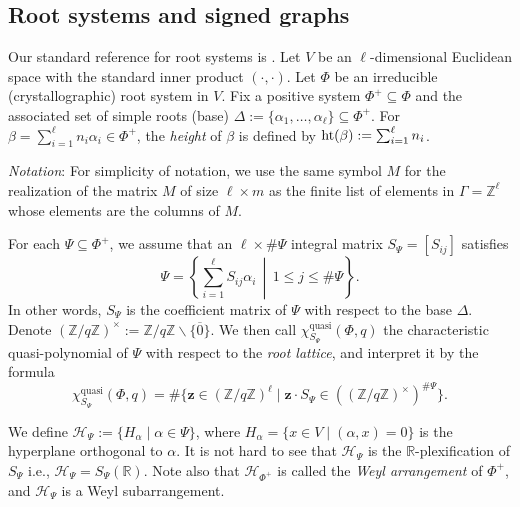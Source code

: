 \documentclass[12pt]{amsart}
\theoremstyle{plain}
\theoremstyle{definition}
\theoremstyle{remark}
\newcommand{\R}{\mathbb{R}}
\newcommand{\Z}{\mathbb{Z}}
\newcommand{\scH}{{\mathcal{H}}}
\newcommand{\quasi}{\operatorname{quasi}}
\begin{document}
\subsection{Root systems and signed graphs}
\label{subsec:Root-systems} 
Our standard reference for root systems is \cite{B68}.
Let $V$ be an $\ell$-dimensional Euclidean space with the standard inner product $(\cdot,\cdot)$. Let $\Phi$ be an irreducible (crystallographic) root system in $V$. 
Fix a positive system $\Phi^+ \subseteq \Phi$ and the associated set of simple roots (base) $\Delta := \{\alpha_1,\ldots,\alpha_\ell \} \subseteq\Phi^+$. 
For $\beta = \sum_{i=1}^\ell n_i\alpha_i \in \Phi^+$, the \emph{height}  of $\beta$ is defined by $ {\rm ht}(\beta) := \sum_{i=1}^\ell n_i $. 

\textit{Notation}: For simplicity of notation, we use the same symbol $M$ for the realization of the matrix $M$ of size $\ell \times m$ as the finite list of elements in $\Gamma=\Z^\ell$ whose elements are the columns of $M$.

For each $\Psi\subseteq\Phi^+$, we assume that an $\ell \times \#\Psi$ integral matrix $S_\Psi = [S_{ij}]$ satisfies
$$\Psi = \left\{\sum_{i=1}^\ell S_{ij}\alpha_i \,\middle|\, 1 \le j \le \#\Psi \right\}.$$
In other words, $S_\Psi$ is the coefficient matrix of $\Psi$ with respect to the base $\Delta$. 
Denote $(\Z/q\Z)^\times:=\Z/q\Z \smallsetminus \{\overline{0}\}$.
We then call $\chi^{\quasi}_{S_\Psi}(\Phi, q)$ the characteristic quasi-polynomial of $\Psi$ with respect to the \emph{root lattice}, and interpret it by the formula 
\begin{equation*}
\chi^{\quasi}_{S_\Psi}(\Phi, q)=\#\{\textbf{z}\in  (\Z/q\Z)^\ell  \mid\textbf{z}\cdot S_\Psi \in ((\Z/q\Z)^\times)^{\#\Psi}\}. 
\end{equation*}


We define $\scH_{\Psi}:= \{H_\alpha \mid \alpha\in\Psi\}$, where $H_\alpha=\{x\in V \mid (\alpha,x)=0\}$ is the hyperplane orthogonal to $\alpha$. 
It is not hard to see that $\scH_{\Psi}$ is the $\R$-plexification of $S_\Psi$ i.e., $\scH_{\Psi}=S_\Psi(\R)$. 
Note also that $\scH_{\Phi^+}$ is called the \emph{Weyl arrangement} of $\Phi^+$, and $\scH_{\Psi}$ is a Weyl subarrangement.
\end{document}
